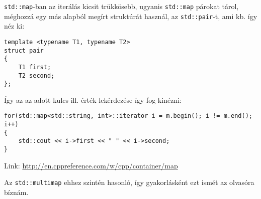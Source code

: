 \documentclass[a4paper,11.5pt]{article}
\begin{document}
	\texttt{std::map}-ban az iterálás kicsit trükkösebb, ugyanis \texttt{std::map} párokat tárol, méghozzá egy más alapból megírt struktúrát használ, az \texttt{std::pair}-t, ami kb. így néz ki:
	\begin{lstlisting}
template <typename T1, typename T2>
struct pair
{
	T1 first;
	T2 second;
};
	\end{lstlisting}
	Így az az adott kulcs ill. érték lekérdezése így fog kinézni:
	\begin{lstlisting}
for(std::map<std::string, int>::iterator i = m.begin(); i != m.end(); i++)
{
	std::cout << i->first << " " << i->second;
}
	\end{lstlisting}
	
	Link: \url{http://en.cppreference.com/w/cpp/container/map}
	\begin{note}
		Az \texttt{std::multimap} ehhez szintén hasonló, így gyakorlásként ezt ismét az olvasóra bíznám.
	\end{note}
\end{document}
